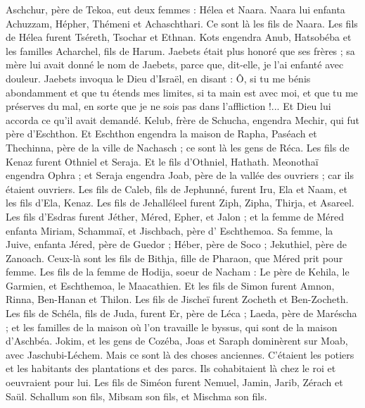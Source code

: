 \begin{multicols}{2}
Aschchur, père de Tekoa, eut deux femmes : Hélea et Naara.
Naara lui enfanta Achuzzam, Hépher, Thémeni et Achaschthari. Ce sont là les fils de Naara.
Les fils de Hélea furent Tséreth, Tsochar et Ethnan.
Kots engendra Anub, Hatsobéba et les familles Acharchel, fils de Harum.
Jaebets était plus honoré que ses frères ; sa mère lui avait donné le nom de Jaebets, parce que, dit-elle, je l'ai enfanté avec douleur.
Jaebets invoqua le Dieu d'Israël, en disant : Ô, si tu me bénis abondamment et que tu étends mes limites, si ta main est avec moi, et que tu me préserves du mal, en sorte que je ne sois pas dans l’affliction !... Et Dieu lui accorda ce qu'il avait demandé.
Kelub, frère de Schucha, engendra Mechir, qui fut père d'Eschthon.
Et Eschthon engendra la maison de Rapha, Paséach et Thechinna, père de la ville de Nachasch ; ce sont là les gens de Réca.
Les fils de Kenaz furent Othniel et Seraja. Et le fils d’Othniel, Hathath.
Meonothaï engendra Ophra ; et Seraja engendra Joab, père de la vallée des ouvriers ; car ils étaient ouvriers.
Les fils de Caleb, fils de Jephunné, furent Iru, Ela et Naam, et les fils d'Ela, Kenaz.
Les fils de Jehalléleel furent Ziph, Zipha, Thirja, et Asareel.
Les fils d'Esdras furent Jéther, Méred, Epher, et Jalon ; et la femme de Méred enfanta Miriam, Schammaï, et Jischbach, père d' Eschthemoa.
Sa femme, la Juive, enfanta Jéred, père de Guedor ;  Héber, père de Soco ;  Jekuthiel, père de Zanoach. Ceux-là sont les fils de Bithja, fille de Pharaon, que Méred prit pour femme.
Les fils de la femme de Hodija, soeur de Nacham : Le père de Kehila, le Garmien, et Eschthemoa, le Maacathien.
Et les fils de Simon furent Amnon, Rinna, Ben-Hanan et Thilon. Les fils de Jischeï furent Zocheth et Ben-Zocheth.
Les fils de Schéla, fils de Juda, furent Er, père de Léca ; Laeda, père de Maréscha ; et les familles de la maison où l'on travaille le byssus, qui sont de la maison d'Aschbéa.
Jokim, et les gens de Cozéba, Joas et Saraph dominèrent sur Moab, avec Jaschubi-Léchem. Mais ce sont là des choses anciennes.
C’étaient les potiers et les habitants des plantations  et des parcs. Ils cohabitaient là chez le roi et oeuvraient pour lui.
Les fils de Siméon furent Nemuel, Jamin, Jarib, Zérach et Saül.
Schallum son fils, Mibsam son fils, et Mischma son fils.

\end{multicols}
